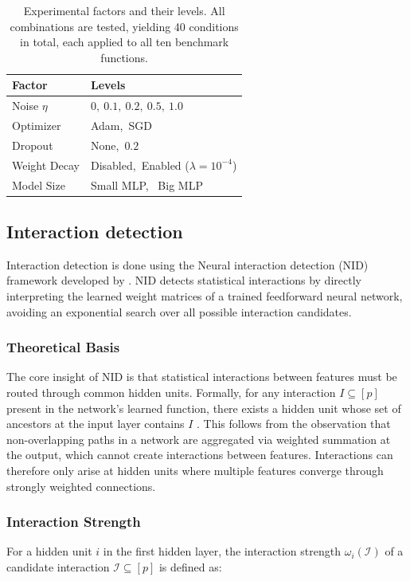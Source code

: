 \documentclass{article}
\begin{document}
\begin{table}[ht]
\centering
\caption{Experimental factors and their levels. All combinations are tested, 
yielding 40 conditions in total, each applied to all ten benchmark functions.}
\label{tab:experiments}
\begin{tabular}{ll}
\toprule
\textbf{Factor} & \textbf{Levels} \\
\midrule
Noise $\eta$    & $0,\ 0.1,\ 0.2,\ 0.5,\ 1.0$ \\
Optimizer       & Adam,\ SGD \\
Dropout         & None,\ $0.2$ \\
Weight Decay    & Disabled,\ Enabled ($\lambda = 10^{-4}$) \\
Model Size      & Small MLP, \ Big MLP\\ 

\bottomrule
\end{tabular}
\end{table}

\subsection{Interaction detection}
Interaction detection is done using the Neural interaction detection (NID) framework developed by \cite{tsang2017detecting}. NID detects 
statistical interactions by directly interpreting the learned weight matrices  of a trained feedforward neural network, avoiding an exponential search over  all possible interaction candidates.

\subsubsection{Theoretical Basis}
The core insight of NID is that statistical interactions between features must 
be routed through common hidden units. Formally, for any interaction 
$I \subseteq [p]$ present in the network's learned function, there exists a 
hidden unit whose set of ancestors at the input layer contains $I$ 
\citep{tsang2017detecting}. This follows from the observation that 
non-overlapping paths in a network are aggregated via weighted summation at 
the output, which cannot create interactions between features. Interactions 
can therefore only arise at hidden units where multiple features converge 
through strongly weighted connections.

\subsubsection{Interaction Strength}
For a hidden unit $i$ in the first hidden layer, the interaction strength 
$\omega_i(\mathcal{I})$ of a candidate interaction $\mathcal{I} \subseteq [p]$ 
is defined as:
\end{document}
